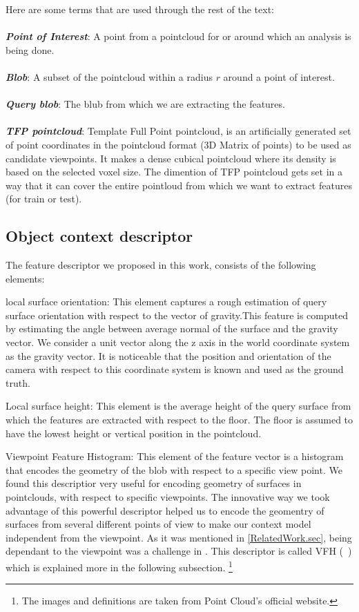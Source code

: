 Here are some terms that are used through the rest of the text:\\
\\
\textbf{\textit{Point of Interest}}: A point from a pointcloud for or around which an analysis is being done.\\
\\
\textbf{\textit{Blob}}: A subset of the pointcloud within a radius $r$ around a point of interest.\\
\\
\textbf{\textit{Query blob}}: The blub from which we are extracting the features.\\
\\
\textbf{\textit{TFP pointcloud}}: Template Full Point pointcloud, is an artificially generated set of point coordinates in the pointcloud format (3D Matrix of points) to be used as candidate viewpoints. It makes a dense cubical pointcloud where its density is based on the selected voxel size. The dimention of TFP pointcloud gets set in a way that it can cover the entire pointloud from which we want to extract features (for train or test).\\



\subsection{Object context descriptor}
\label{OCD.ssec}
 
The feature descriptor we proposed in this work, consists of the following elements:

local surface orientation:
This element captures a rough estimation of query surface orientation with respect to the vector of gravity.This feature is computed by estimating the angle between average normal of the surface and the gravity vector. We consider a unit vector along the z axis in the world coordinate system as the gravity vector. It is noticeable that the position and orientation of the camera with respect to this coordinate system is known and used as
the ground truth.


Local surface height:
This element is the average height of the query surface from which the features are extracted with respect to the floor. The floor is assumed to have the lowest height or vertical position in the pointcloud.
 

Viewpoint Feature Histogram:
This element of the feature vector is a histogram that encodes the geometry of the blob with respect to a specific view point. We found this descriptior very useful for encoding geometry of surfaces in pointclouds, with respect to specific viewpoints. The innovative way we took advantage of this powerful descriptor helped us to encode the geomentry of surfaces from several different points of view to make our context model independent from the viewpoint. As it was mentioned in \ref{RelatedWork.sec}, being dependant to the viewpoint was a challenge in \cite{aydemir2012_3Dcontext}.
This descriptor is called VFH (~\cite{5651280}) which is explained more in the following subsection. \footnote{The images and definitions are taken from Point Cloud's official website.}

